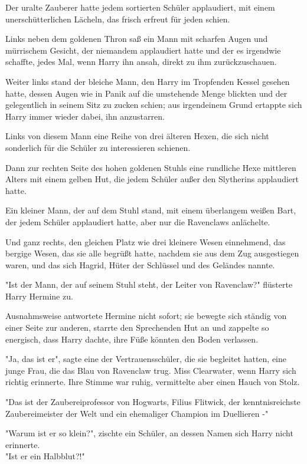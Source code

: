 {Der uralte Zauberer hatte jedem sortierten Schüler applaudiert, mit einem unerschütterlichen Lächeln, das frisch erfreut für jeden schien.

Links neben dem goldenen Thron saß ein Mann mit scharfen Augen und mürrischem Gesicht, der niemandem applaudiert hatte und der es irgendwie schaffte, jedes Mal, wenn Harry ihn ansah, direkt zu ihm zurückzuschauen.

Weiter links stand der bleiche Mann, den Harry im Tropfenden Kessel gesehen hatte, dessen Augen wie in Panik auf die umstehende Menge blickten und der gelegentlich in seinem Sitz zu zucken schien; aus irgendeinem Grund ertappte sich Harry immer wieder dabei, ihn anzustarren.

Links von diesem Mann eine Reihe von drei älteren Hexen, die sich nicht sonderlich für die Schüler zu interessieren schienen.

Dann zur rechten Seite des hohen goldenen Stuhls eine rundliche Hexe mittleren Alters mit einem gelben Hut, die jedem Schüler außer den Slytherins applaudiert hatte.

Ein kleiner Mann, der auf dem Stuhl stand, mit einem überlangem weißen Bart, der jedem Schüler applaudiert hatte, aber nur die Ravenclaws anlächelte.

Und ganz rechts, den gleichen Platz wie drei kleinere Wesen einnehmend, das bergige Wesen, das sie alle begrüßt hatte, nachdem sie aus dem Zug ausgestiegen waren, und das sich Hagrid, Hüter der Schlüssel und des Geländes nannte.

"Ist der Mann, der auf seinem Stuhl steht, der Leiter von Ravenclaw?" flüsterte Harry Hermine zu.

Ausnahmsweise antwortete Hermine nicht sofort; sie bewegte sich ständig von einer Seite zur anderen, starrte den Sprechenden Hut an und zappelte so energisch, dass Harry dachte, ihre Füße könnten den Boden verlassen.

"Ja, das ist er", sagte eine der Vertrauensschüler, die sie begleitet hatten, eine junge Frau, die das Blau von Ravenclaw trug. Miss Clearwater, wenn Harry sich richtig erinnerte. Ihre Stimme war ruhig, vermittelte aber einen Hauch von Stolz.

"Das ist der Zaubereiprofessor von Hogwarts, Filius Flitwick, der kenntnisreichste Zaubereimeister der Welt und ein ehemaliger Champion im Duellieren -"

"Warum ist er so klein?", zischte ein Schüler, an dessen Namen sich Harry nicht erinnerte.\\ "Ist er ein Halbblut?!"

}
